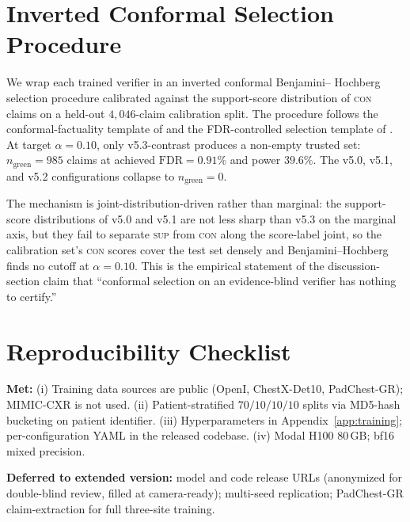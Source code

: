 \documentclass{article}
\begin{document}
\section{Inverted Conformal Selection Procedure}
\label{app:conformal}

We wrap each trained verifier in an inverted conformal Benjamini--
Hochberg selection procedure calibrated against the support-score
distribution of \textsc{con} claims on a held-out $4{,}046$-claim
calibration split. The procedure follows the conformal-factuality
template of \citet{mohri2024conformal} and the FDR-controlled selection
template of \citet{gui2024conformal}. At target $\alpha = 0.10$, only
v5.3-contrast produces a non-empty trusted set: $n_{\mathrm{green}} =
985$ claims at achieved $\mathrm{FDR} = 0.91\%$ and power $39.6\%$. The
v5.0, v5.1, and v5.2 configurations collapse to $n_{\mathrm{green}} =
0$.

The mechanism is joint-distribution-driven rather than marginal:
the support-score distributions of v5.0 and v5.1 are not less sharp
than v5.3 on the marginal axis, but they fail to separate \textsc{sup}
from \textsc{con} along the score-label joint, so the calibration set's
\textsc{con} scores cover the test set densely and Benjamini--Hochberg
finds no cutoff at $\alpha = 0.10$. This is the empirical statement of
the discussion-section claim that ``conformal selection on an
evidence-blind verifier has nothing to certify.''

\section{Reproducibility Checklist}
\label{app:repro}

\textbf{Met:} (i) Training data sources are public (OpenI, ChestX-Det10,
PadChest-GR); MIMIC-CXR is not used. (ii) Patient-stratified
$70/10/10/10$ splits via MD5-hash bucketing on patient identifier. (iii)
Hyperparameters in Appendix~\ref{app:training}; per-configuration YAML
in the released codebase. (iv) Modal H100 80\,GB; bf16 mixed precision.

\textbf{Deferred to extended version:} model and code release URLs
(anonymized for double-blind review, filled at camera-ready); multi-seed
replication; PadChest-GR claim-extraction for full three-site training.



\end{document}
